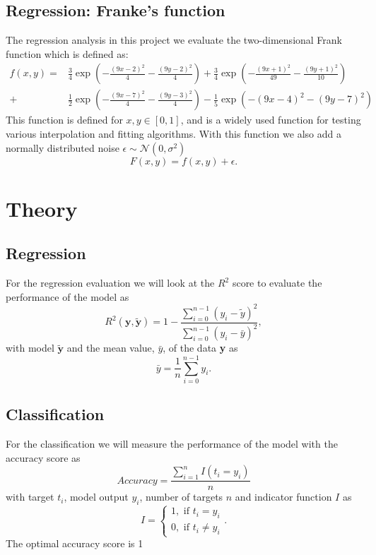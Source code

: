 \documentclass[12pt,a4paper,english]{article}
\begin{document}
\subsection{Regression: Franke's function}
The regression analysis in this project we evaluate the two-dimensional Frank function which is defined as:
\begin{align}
\label{eq:Franke_func}
f(x,y)=&\frac{3}{4}\exp\left(-\frac{(9x-2)^2}{4}-\frac{(9y-2)^2}{4}\right)+
\frac{3}{4}\exp\left(-\frac{(9x+1)^2}{49}-\frac{(9y+1)^2}{10}\right)\\ 
+& \frac{1}{2}\exp\left(-\frac{(9x-7)^2}{4}-\frac{(9y-3)^2}{4}\right)- \frac{1}{5}\exp\left(-(9x-4)^2-(9y-7)^2\right) \nonumber
\end{align}
This function is defined for $x,y\in[0,1]$, and is a widely used function for testing various interpolation and fitting algorithms. With this function we also add a normally distributed noise $\epsilon\sim \mathcal{N}(0,\sigma^2)$
\begin{equation*}
F(x,y)=f(x,y)+\epsilon.
\end{equation*}

\section{Theory}
\subsection{Regression}
For the regression evaluation we will look at the $R^2$ score to evaluate the performance of the model as
\begin{equation}
\label{eq:R2_score}
R^2(\textbf{y},\tilde{\textbf{y}})=1-\frac{\sum_{i=0}^{n-1}(y_i-\tilde{y})^2}{\sum_{i=0}^{n-1}(y_i-\bar{y})^2},
\end{equation}
with model $\tilde{\textbf{y}}$ and the mean value, $\bar{y}$, of the data \textbf{y} as
\[\bar{y}=\frac{1}{n}\sum_{i=0}^{n-1}y_i.\]

\subsection{Classification}
For the classification we will measure the performance of the model with the accuracy score as
\begin{equation}
\label{eq:accuracy_score}
Accuracy=\frac{\sum_{i=1}^{n}I(t_i=y_i)}{n}
\end{equation}
with target $t_i$, model output $y_i$, number of targets $n$ and indicator function $I$ as
\[I=\begin{cases}
1, \text{ if } t_i=y_i\\
0, \text{ if } t_i\neq y_i
\end{cases}.\]
The optimal accuracy score is 1
\end{document}
